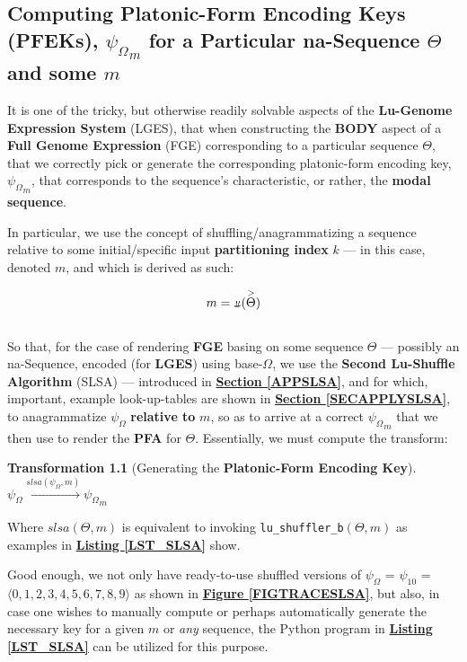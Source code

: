\documentclass[a4paper, 18pt]{book} %
\newtheorem{trans}{Transformation}
\newcommand{\invpi}{\rotatebox[origin=c]{180}{$\pi$}}
\begin{document}
\begin{appendices}
\chapter{Computing Platonic-Form Encoding Keys (PFEKs), $\boxed{\psi_\Omega}_m$ for a Particular na-Sequence $\Theta$ and some $m$}
\label{SECIFAMSSPFMAPS}


It is one of the tricky, but otherwise readily solvable aspects of the \textbf{Lu-Genome Expression System} (LGES), that when constructing the \textbf{BODY} aspect of a \textbf{Full Genome Expression} (FGE) corresponding to a particular sequence $\Theta$, that we correctly pick or generate the corresponding platonic-form encoding key, $\boxed{\psi_\Omega}_m$, that corresponds to the sequence's characteristic, or rather, the \textbf{modal sequence}. 


In particular, we use the concept of shuffling/anagrammatizing a sequence relative to some initial/specific input \textbf{partitioning index} $k$ --- in this case, denoted $m$, and which is derived as such:

\begin{equation}
 m = \invpi(\overset{>}{\Theta})
\end{equation}\\

So that, for the case of rendering \textbf{FGE} basing on some sequence $\Theta$ --- possibly an na-Sequence, encoded (for \textbf{LGES}) using base-$\Omega$, we use the \textbf{Second Lu-Shuffle Algorithm} (SLSA) --- introduced in \textbf{\hyperref[APPSLSA]{Section \ref{APPSLSA}}}, and for which, important, example look-up-tables are shown in \textbf{\hyperref[SECAPPLYSLSA]{Section \ref{SECAPPLYSLSA}}}, to anagrammatize $\psi_\Omega$ \textbf{relative to} $m$, so as to arrive at a correct $\boxed{\psi_\Omega}_m$ that we then use to render the \textbf{PFA} for $\Theta$. Essentially, we must compute the transform:\\


\begin{trans}[Generating the \textbf{Platonic-Form Encoding Key}]
$ $\\
$\psi_\Omega \xrightarrow{slsa(\psi_\Omega, m)} \boxed{\psi_\Omega}_m$\\
\end{trans}
 
Where $slsa(\Theta,m)$ is equivalent to invoking \texttt{lu\_shuffler\_b$(\Theta,m)$} as examples in \textbf{\hyperref[LST_SLSA]{Listing \ref{LST_SLSA}}} show. 

Good enough, we not only have ready-to-use shuffled versions of $\psi_\Omega$ = $\psi_{10}$ = $\langle 0, 1, 2, 3, 4, 5, 6, 7, 8, 9 \rangle$ as shown in \textbf{\hyperref[FIGTRACESLSA]{Figure \ref{FIGTRACESLSA}}}, but also, in case one wishes to manually compute or perhaps automatically generate the necessary key for a given $m$ or \textit{any} sequence, the Python program in \textbf{\hyperref[LST_SLSA]{Listing \ref{LST_SLSA}}} can be utilized for this purpose.
 


\end{appendices}
\end{document}
